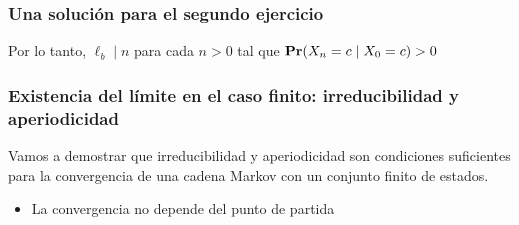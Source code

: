 \begin{frame}
\frametitle{Una solución para el segundo ejercicio}

{\small

Por lo tanto, $\ell_b \mid n$ para cada $n > 0$ tal que ${\rm {\bf Pr}}(X_n = c \mid X_0 = c) > 0$



}

\end{frame}


\begin{frame}
\frametitle{Existencia del límite en el caso finito: irreducibilidad y aperiodicidad}

{\small

Vamos a demostrar que irreducibilidad y aperiodicidad son condiciones suficientes para la convergencia de una cadena Markov con un conjunto finito de estados.
\begin{itemize}
\item La convergencia no depende del punto de partida
\end{itemize}




}

\end{frame}

